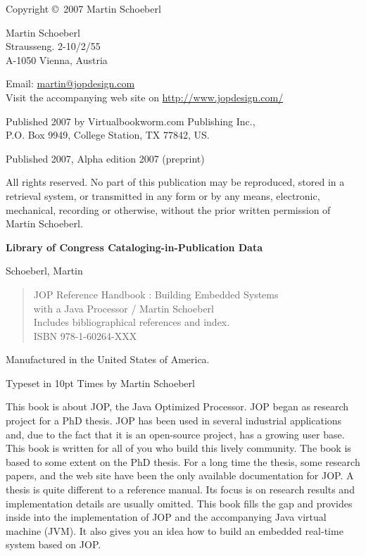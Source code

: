 \thispagestyle{empty}
\begin{flushleft}
{\small

Copyright \copyright \ 2007 Martin Schoeberl
\medskip

Martin Schoeberl\\
Strausseng. 2-10/2/55\\
A-1050 Vienna, Austria\\
\medskip

Email: \url{martin@jopdesign.com}\\
Visit the accompanying web site on \url{http://www.jopdesign.com/}
\medskip

Published 2007 by Virtualbookworm.com Publishing Inc.,\\
P.O. Box 9949, College Station, TX 77842, US.
\medskip

Published 2007, Alpha edition 2007 (preprint)
\medskip

All rights reserved. No part of this publication may be reproduced,
stored in a retrieval system, or transmitted in any form or by any
means, electronic, mechanical, recording or otherwise, without the
prior written permission of Martin Schoeberl.
\medskip


\textbf{Library of Congress Cataloging-in-Publication Data}
\medskip

Schoeberl, Martin
\begin{quote}
    JOP Reference Handbook : Building Embedded Systems\\
    with a Java Processor / Martin Schoeberl\\
    Includes bibliographical references and index.\\
    ISBN 978-1-60264-XXX
\end{quote}

\bigskip


Manufactured in the United States of America.

Typeset in 10pt Times by Martin Schoeberl }
\end{flushleft}



This book is about JOP, the Java Optimized Processor. JOP began as
research project for a PhD thesis. JOP has been used in several
industrial applications and, due to the fact that it is an
open-source project, has a growing user base. This book is written
for all of you who build this lively community. The book is based to
some extent on the PhD thesis. For a long time the thesis, some
research papers, and the web site  have been the only available
documentation for JOP. A thesis is quite different to a reference
manual. Its focus is on research results and implementation details
are usually omitted. This book fills the gap and provides inside
into the implementation of JOP and the accompanying Java virtual
machine (JVM). It also gives you an idea how to build an embedded
real-time system based on JOP.
